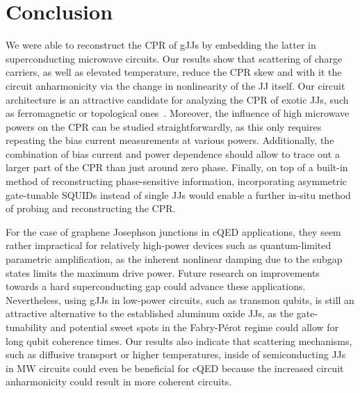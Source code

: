 \section{Conclusion}

We were able to reconstruct the CPR of gJJs by embedding the latter in superconducting microwave circuits.
%
Our results show that scattering of charge carriers, as well as elevated temperature, reduce the CPR skew and with it the circuit anharmonicity via the change in nonlinearity of the JJ itself.
%
Our circuit architecture is an attractive candidate for analyzing the CPR of exotic JJs, such as ferromagnetic or topological ones~\cite{golubovCurrentphaseRelationJosephson2004a,sochnikovNonsinusoidalCurrentPhaseRelationship2015,stoutimoreSecondHarmonicCurrentPhaseRelation2018,assoulineSpinOrbitInducedPhaseshift2019,muraniMicrowaveSignatureTopological2019}.
%
Moreover, the influence of high microwave powers on the CPR can be studied straightforwardly, as this only requires repeating the bias current measurements at various powers.
%
Additionally, the combination of bias current and power dependence should allow to trace out a larger part of the CPR than just around zero phase.
%
Finally, on top of a built-in method of reconstructing phase-sensitive information, incorporating asymmetric gate-tunable SQUIDs instead of single JJs would enable a further in-situ method of probing and reconstructing the CPR.

For the case of graphene Josephson junctions in cQED applications, they seem rather impractical for relatively high-power devices such as quantum-limited parametric amplification, as the inherent nonlinear damping due to the subgap states limits the maximum drive power.
%
Future research on improvements towards a hard superconducting gap could advance these applications.
%
Nevertheless, using gJJs in low-power circuits, such as transmon qubits, is still an attractive alternative to the established aluminum oxide JJs, as the gate-tunability and potential sweet spots in the Fabry-Pérot regime could allow for long qubit coherence times.
%
Our results also indicate that scattering mechanisms, such as diffusive transport or higher temperatures, inside of semiconducting JJs in MW circuits could even be beneficial for cQED because the increased circuit anharmonicity could result in more coherent circuits.


\clearpage
\pagebreak

